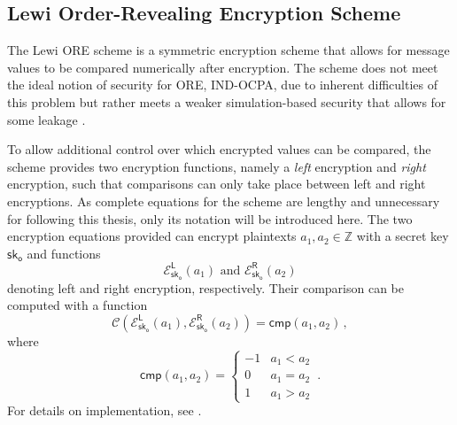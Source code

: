 % 
% 

\subsection{Lewi Order-Revealing Encryption Scheme}\label{subsec:prelims:lewi_ore}
The Lewi ORE scheme is a symmetric encryption scheme that allows for message values to be compared numerically after encryption. The scheme does not meet the ideal notion of security for ORE, IND-OCPA, due to inherent difficulties of this problem but rather meets a weaker simulation-based security that allows for some leakage \cite{chenettePracticalOrderRevealingEncryption2016}.

To allow additional control over which encrypted values can be compared, the scheme provides two encryption functions, namely a \textit{left} encryption and \textit{right} encryption, such that comparisons can only take place between left and right encryptions. As complete equations for the scheme are lengthy and unnecessary for following this thesis, only its notation will be introduced here. The two encryption equations provided can encrypt plaintexts $a_1,a_2\in\mathbb{Z}$ with a secret key $\mathsf{sk}_{\mathsf{o}}$ and functions
\begin{equation}\label{eq:prelims:lewi_enc}
    \mathcal{E}^{\mathsf{L}}_{\mathsf{sk}_{\mathsf{o}}}\left(a_1\right)\text{ and }\mathcal{E}^{\mathsf{R}}_{\mathsf{sk}_{\mathsf{o}}}\left(a_2\right)
\end{equation}
denoting left and right encryption, respectively. Their comparison can be computed with a function
\begin{equation}\label{eq:prelims:lewi_comp}
    \mathcal{C}\left(\mathcal{E}^{\mathsf{L}}_{\mathsf{sk}_{\mathsf{o}}}(a_1), \mathcal{E}^{\mathsf{R}}_{\mathsf{sk}_{\mathsf{o}}}(a_2)\right) = \mathsf{cmp}(a_1, a_2)\,,
\end{equation}
where
\begin{equation}
    \mathsf{cmp}(a_1, a_2)=
    \begin{cases}
        -1 & a_1 < a_2\\
        0 & a_1 = a_2\\
        1 & a_1 > a_2
    \end{cases}\,.
\end{equation}
For details on implementation, see \cite{lewiOrderRevealingEncryptionNew2016}.

